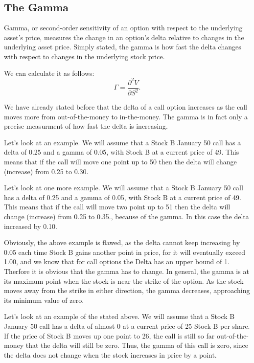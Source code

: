 \documentclass[a4paper, 12pt]{article}
\theoremstyle{definition}
\theoremstyle{plain}
\begin{document}
\subsection{The Gamma}

Gamma, or second-order sensitivity of an option 
with respect to the underlying asset's price, 
measures the change in an option's delta relative to changes 
in the underlying asset price. 
Simply stated, the gamma is how fast the delta changes with respect to changes in the
underlying stock price.

We can calculate it as follows:
$$
\Gamma = \frac{\partial^2 V}{\partial S^2}.
$$

We have already stated before that the delta of a call option 
increases as the call moves more from out-of-the-money to in-the-money.
The gamma is in fact only a precise measurment of how fast the delta is 
increasing.

Let's look at an example. We will assume that a Stock B January 50 call has a delta of 0.25
and a gamma of 0.05, with Stock B at a current price of 49. 
This means that if the call will move one point up to 50
then the delta will change (increase) from 0.25 to 0.30.

Let's look at one more example. We will assume that a Stock B January 50 call has a 
delta of 0.25 and a gamma of 0.05, with Stock B at a current price of 49. 
This means that if the call will move two point up to 51
then the delta will change (increase) from 0.25 to 0.35.,
because of the gamma.
In this case the delta increased by 0.10.

Obviously, the above example is flawed, as the
delta cannot keep increasing by 0.05 each time 
Stock B gains another point in price, for it will eventually exceed 1.00,
and we know that for call options the Delta has an upper bound of 1.
Therfore it is obvious that the gamma has to change.
In general, the gamma is at its maximum point when the stock is near the strike of the
option.
As the stock moves away from the strike in either direction, the gamma
decreases, approaching its minimum value of zero. 

Let's look at an example of the stated above. 
We will assume that a Stock B January 50 call has a 
delta of almost 0 at a current price of 25  Stock B per share.
If the price of Stock B moves up one point to 26, 
the call is still so far out-of-the-money that the delta
will still be zero.  Thus, the gamma of this call is zero, 
since the delta does not change when the stock increases in price by a point.
\end{document}
